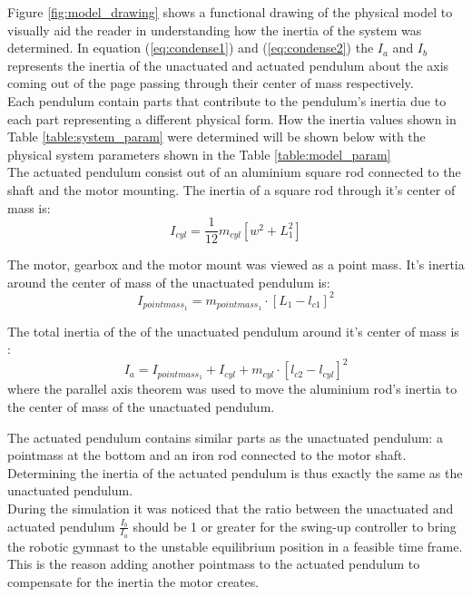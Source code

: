 Figure \ref{fig:model_drawing} shows a functional drawing of the physical model to visually aid the reader in understanding how the inertia of the system was determined. In equation (\ref{eq:condense1}) and (\ref{eq:condense2}) the $I_{a}$ and $I_{b}$ represents the inertia of the unactuated and actuated pendulum about the axis coming out of the page passing through their center of mass respectively.\\

Each pendulum contain parts that contribute to the pendulum's inertia due to each part representing a different physical form. How the inertia values shown in Table \ref{table:system_param} were determined will be shown below with the physical system parameters shown in the Table \ref{table:model_param}\\

The actuated pendulum consist out of an aluminium square rod connected to the shaft and the motor mounting. The inertia of a square rod through it's center of mass is: $$ I_{cyl} = \frac{1}{12}m_{cyl}[w^2+L^2_{1}]$$

The motor, gearbox and the motor mount was viewed as a point mass. It's inertia around the center of mass of the unactuated pendulum is: $$I_{pointmass_1} = m_{pointmass_1}\cdot[L_{1}-l_{c1}]^2 $$

The total inertia of the of the unactuated pendulum around it's center of mass is : $$ I_{a} =I_{pointmass_1} +  I_{cyl} + m_{cyl}\cdot[l_{c2}-l_{cyl}]^2 $$ where the parallel axis theorem was used to move the aluminium rod's inertia to the center of mass of the unactuated pendulum.

The actuated pendulum contains similar parts as the unactuated pendulum: a pointmass at the bottom and an iron rod connected to the motor shaft. Determining the inertia of the actuated pendulum is thus exactly the same as the unactuated pendulum.\\

During the simulation it was noticed that the ratio between the unactuated and actuated pendulum $\frac{I_{b}}{I_{a}}$ should be 1 or greater for the swing-up controller to bring the robotic gymnast to the unstable equilibrium position in a feasible time frame. This is the reason adding another pointmass to the actuated pendulum to compensate for the inertia the motor creates.


